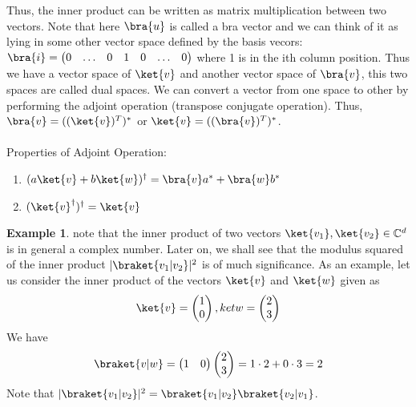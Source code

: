 \documentclass[12pt, oneside]{book}
\theoremstyle{definition}
\theoremstyle{definition}
\newtheorem{example}{Example}[section]
\theoremstyle{remark}
\begin{document}
Thus, the inner product can be written as matrix multiplication between two vectors. 
Note that here $\bra{u}$ is called a bra vector and we can think of it as lying in some other vector space defined by the basis vecors:
$\bra{i}=\begin{pmatrix} 0 & \ldots & 0 & 1 & 0 & \ldots & 0 \end{pmatrix}$ where 1 is in the ith column position. Thus we have a vector space of $\ket{v}$ and another vector space
of $\bra{v}$, this two spaces are called dual spaces. We can convert a vector from one space to other by performing the adjoint operation (transpose conjugate operation). Thus, $\bra{v}=((\ket{v})^{T})^{*}$ or $\ket{v}=((\bra{v})^{T})^{*}$. \\
\\
Properties of Adjoint Operation:
\begin{enumerate}
    \item $(a\ket{v}+b\ket{w})^{\dagger}=\bra{v}a^{*}+\bra{w}b^{*}$
    \item $(\ket{v}^{\dagger})^{\dagger}=\ket{v}$
\end{enumerate}

\begin{example}
    note that the inner product of two vectors $\ket{v_1},\ket{v_2} \in \mathbb{C}^d$ is in general a complex number. Later on, we shall see that the modulus squared of the inner product $|\braket{v_1|v_2}|^2$ is of much significance. As an example, let us consider the inner product of the vectors $\ket{v}$ and $\ket{w}$ given as
    \[
    \ket{v}=\begin{pmatrix} 1 \\0 \end{pmatrix},ket{w}=\begin{pmatrix} 2 \\ 3 \end{pmatrix}
    \]
    We have
    \[
    \braket{v|w}=\begin{pmatrix} 1 & 0 \end{pmatrix} \begin{pmatrix}2 \\3 \end{pmatrix}=1\cdot 2+0\cdot 3 =2
    \]
    Note that $|\braket{v_1|v_2}|^2=\braket{v_1|v_2}\braket{v_2|v_1}$.
\end{example}
\end{document}
